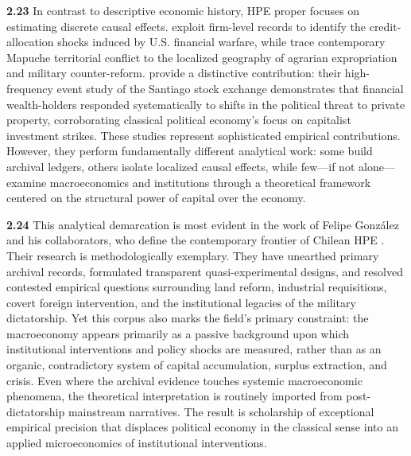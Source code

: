 \textbf{2.23} In contrast to descriptive economic history, HPE proper focuses on estimating discrete causal 
effects. \citet{AldunateGonzalezPrem2024} exploit firm-level records to identify the credit-allocation 
shocks induced by U.S. financial warfare, while \citet{JaimovichToledo2021} trace contemporary Mapuche territorial 
conflict to the localized geography of agrarian expropriation and military counter-reform. \citet{GirardiBowles2018} 
provide a distinctive contribution: their high-frequency event study of the Santiago stock exchange demonstrates 
that financial wealth-holders responded systematically to shifts in the political threat to private property, 
corroborating classical political economy's focus on capitalist investment strikes. These studies represent 
sophisticated empirical contributions. However, they perform fundamentally different analytical work: some 
build archival ledgers, others isolate localized causal effects, while few---if not \citet{GirardiBowles2018} 
alone---examine macroeconomics and institutions through a theoretical framework centered on the structural 
power of capital over the economy.

\textbf{2.24} This analytical demarcation is most evident in the work of Felipe González and his collaborators, 
who define the contemporary frontier of Chilean HPE \citep{Gonzalez2013,GonzalezVial2021,AldunateGonzalezPrem2024,GonzalezPremUrzua2020,BautistaEtAl2023,GonzalezPrem2026Nat,GonzalezPrem2026Trans}. 
Their research is methodologically exemplary. They have unearthed primary archival records, formulated transparent 
quasi-experimental designs, and resolved contested empirical questions surrounding land reform, industrial 
requisitions, covert foreign intervention, and the institutional legacies of the military dictatorship. Yet this 
corpus also marks the field's primary constraint: the macroeconomy appears primarily as a passive background 
upon which institutional interventions and policy shocks are measured, rather than as an organic, contradictory 
system of capital accumulation, surplus extraction, and crisis. Even where the archival evidence touches systemic 
macroeconomic phenomena, the theoretical interpretation is routinely imported from post-dictatorship mainstream 
narratives. The result is scholarship of exceptional empirical precision that displaces political economy in the 
classical sense into an applied microeconomics of institutional interventions.

